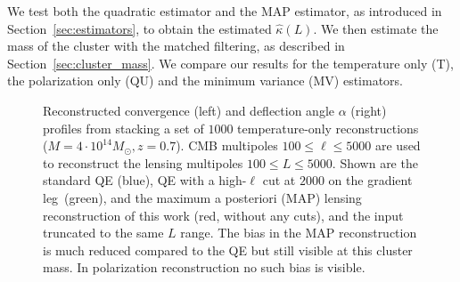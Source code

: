 \documentclass[prd, superscriptaddress, tightenlines, longbibliography, nofootinbib, eqsecnum, amsfonts, amsmath, floatfix, twocolumn, notitlepage]{revtex4-2}
\newcommand{\JC}[1]{\color{purple}{{JC:#1}}\color{black}\xspace}
\begin{document}
We test both the quadratic estimator and the MAP estimator, as introduced in Section~\ref{sec:estimators}, to obtain the estimated $\hat{\kappa}(L)$.
We then estimate the mass of the cluster with the matched filtering, as described in Section~\ref{sec:cluster_mass}. We compare our results for the temperature only (T), the polarization only (QU) and the minimum variance (MV)\JC{TQU, or `GMV'} estimators.

\begin{figure}
  \caption{Reconstructed convergence (left) and deflection angle $\alpha$ (right) profiles from  stacking a set of $1000$ temperature-only reconstructions ($M = 4 \cdot 10^{14} M_\odot, z=0.7$). CMB multipoles $100 \leq \ell \leq 5000$ are used to reconstruct the lensing multipoles $100 \leq L \leq 5000$. Shown are the standard QE (blue), QE with a high-$\ell$ cut at $2000$ on the gradient leg~\cite{Hu:2007bt}(green), and the maximum a posteriori (MAP) lensing reconstruction of this work (red, without any cuts), and the input truncated to the same $L$ range. The bias in the MAP reconstruction is much reduced compared to the QE but still visible at this cluster mass. In polarization reconstruction no such bias is visible.}
  \label{fig:Bias_sup}
  \end{figure}
\end{document}
